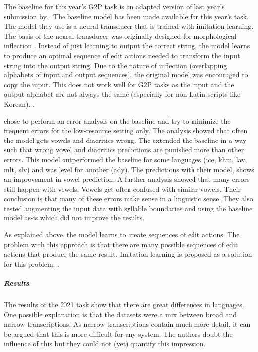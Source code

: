 The baseline for this year's G2P task is an adapted version of last year's submission by \citet{makarov-clematide-2020-cluzh}. The baseline model has been made available for this year's task. The model they use is a neural transducer that is trained with imitation learning. The basis of the neural transducer was originally designed for morphological inflection \citep{Aharoni&Goldberg.2016}. Instead of just learning to output the correct string, the model learns to produce an optimal sequence of edit actions needed to transform the input string into the output string. Due to the nature of inflection (overlapping alphabets of input and output sequences), the original model was encouraged to copy the input. This does not work well for G2P tasks as the input and the output alphabet are not always the same (especially for non-Latin scripts like Korean). .

\citet{lo-nicolai-2021-linguistic} chose to perform an error analysis on the baseline and try to minimize the frequent errors for the low-resource setting only. The analysis showed that often the model gets vowels and diacritics wrong. The extended the baseline in a way such that wrong vowel and diacritics predictions are punished more than other errors. This model outperformed the baseline for some languages (ice, khm, lav, mlt, slv) and was level for another (ady). The predictions with their model, shows an improvement in vowel prediction. A further analysis showed that many errors still happen with vowels. Vowels get often confused with similar vowels. Their conclusion is that many of these errors make sense in a linguistic sense.   
They also tested augmenting the input data with syllable boundaries and using the baseline model as-is which did not improve the results. 

As explained above, the model learns to create sequences of edit actions. The problem with this approach is that there are many possible sequences of edit actions that produce the same result. Imitation learning is proposed as a solution for this problem. . 

\subparagraph{Results}
The results of the 2021 task show that there are great differences in languages. One possible explanation is that the datasets were a mix between broad and narrow transcriptions. As narrow transcriptions contain much more detail, it can be argued that this is more difficult for any system. The authors doubt the influence of this but they could not (yet) quantify this impression. 

